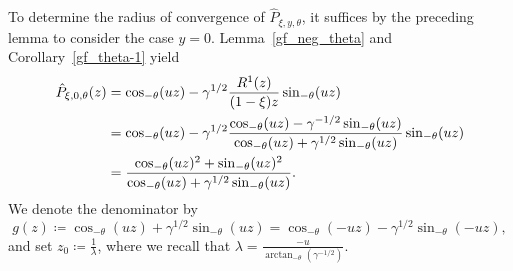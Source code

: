 \documentclass[12pt]{article}
\newcommand{\1}{\mathds{1}}
\theoremstyle{definition}
\theoremstyle{plain}
\theoremstyle{remark}
\begin{document}
To determine the radius of convergence of $\hat{P}_{\xi,y,\theta}$, it suffices by the preceding lemma to consider the case $y=0$.  Lemma~\ref{gf_neg_theta} and Corollary~\ref{gf_theta-1} yield  
     \begin{align}\label{quotient_hat_P_thetaneg}
      \hat{P}_{\xi,0,\theta}(z)&=  
      \cos_{-\theta}(uz)
     -\gamma^{1/2}\frac{R^1(z)}{(1-\xi) z}\sin_{-\theta}(uz)\notag
     \\&=\cos_{-\theta}(uz)
     -\gamma^{1/2}\frac{\cos_{-\theta}(uz)-\gamma^{-1/2}\sin_{-\theta}(uz)}{\cos_{-\theta}(uz)+\gamma^{1/2}\sin_{-\theta}(uz)}\sin_{-\theta}(uz)\notag
     \\&=\frac{\cos_{-\theta}(uz)^2+\sin_{-\theta}(uz)^2}{\cos_{-\theta}(uz)+\gamma^{1/2}\sin_{-\theta}(uz)}.
    \end{align}
We denote the denominator by $$g(z)\coloneqq\cos_{-\theta}(uz)+\gamma^{1/2}\sin_{-\theta}(uz)=\cos_{-\theta}(-uz)-\gamma^{1/2}\sin_{-\theta}(-uz),$$
and set $z_0\coloneqq\frac{1}{\lambda}$, where we recall that $\lambda=\frac{-u}{\arctan_{-\theta}\left(\gamma^{-1/2}\right)}$.
\end{document}

